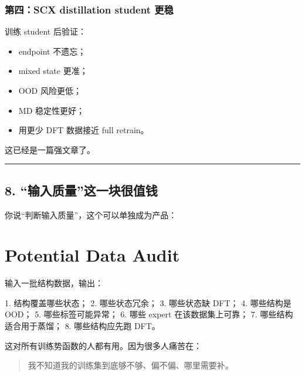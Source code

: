 \documentclass[
  12pt,
]{ctexart}
\newenvironment{Shaded}{}{}
\newcommand{\NormalTok}[1]{#1}
\providecommand{\tightlist}{%
  \setlength{\itemsep}{0pt}\setlength{\parskip}{0pt}}
\begin{document}
\subsubsection{第四：SCX distillation student
更稳}\label{ux7b2cux56dbscx-distillation-student-ux66f4ux7a33}

训练 student 后验证：

\begin{itemize}
\tightlist
\item
  endpoint 不遗忘；
\item
  mixed state 更准；
\item
  OOD 风险更低；
\item
  MD 稳定性更好；
\item
  用更少 DFT 数据接近 full retrain。
\end{itemize}

这已经是一篇强文章了。

\begin{center}\rule{0.5\linewidth}{0.5pt}\end{center}

\subsection{8.
``输入质量''这一块很值钱}\label{ux8f93ux5165ux8d28ux91cfux8fd9ux4e00ux5757ux5f88ux503cux94b1}

你说``判断输入质量''，这个可以单独成为产品：

\section{\texorpdfstring{\textbf{Potential Data
Audit}}{Potential Data Audit}}\label{potential-data-audit}

输入一批结构数据，输出：

\begin{Shaded}
\begin{Highlighting}[]
\NormalTok{1. 结构覆盖哪些状态；}
\NormalTok{2. 哪些状态冗余；}
\NormalTok{3. 哪些状态缺 DFT；}
\NormalTok{4. 哪些结构是 OOD；}
\NormalTok{5. 哪些标签可能异常；}
\NormalTok{6. 哪些 expert 在该数据集上可靠；}
\NormalTok{7. 哪些结构适合用于蒸馏；}
\NormalTok{8. 哪些结构应先跑 DFT。}
\end{Highlighting}
\end{Shaded}

这对所有训练势函数的人都有用。因为很多人痛苦在：

\begin{quote}
我不知道我的训练集到底够不够、偏不偏、哪里需要补。
\end{quote}
\end{document}
